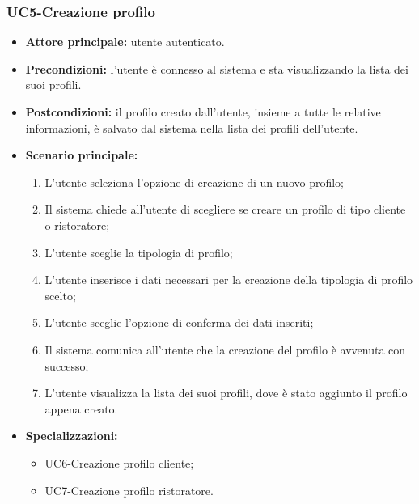 \subsubsection{UC5-Creazione profilo}
\begin{itemize}
    \item \textbf{Attore principale:} utente autenticato.
    \item \textbf{Precondizioni:} l'utente è connesso al sistema e sta visualizzando la lista dei suoi profili.
    \item \textbf{Postcondizioni:} il profilo creato dall'utente, insieme a tutte le relative informazioni,
    è salvato dal sistema nella lista dei profili dell'utente.
    \item \textbf{Scenario principale:}
    \begin{enumerate}
        \item L'utente seleziona l'opzione di creazione di un nuovo profilo;
        \item Il sistema chiede all'utente di scegliere se creare un profilo di tipo cliente
        o ristoratore;
        \item L'utente sceglie la tipologia di profilo;
        \item L'utente inserisce i dati necessari per la creazione della tipologia di profilo scelto;
        \item L'utente sceglie l'opzione di conferma dei dati inseriti;
        \item Il sistema comunica all'utente che la creazione del profilo è avvenuta con successo;
        \item L'utente visualizza la lista dei suoi profili, dove è stato aggiunto il profilo appena creato.
    \end{enumerate}
    \item \textbf{Specializzazioni:}
        \begin{itemize}
            \item UC6-Creazione profilo cliente;
            \item UC7-Creazione profilo ristoratore.
        \end{itemize}
\end{itemize}

